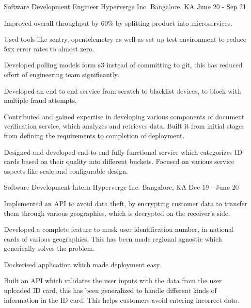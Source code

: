 \begin{cventries}
  \cventry
    {Software Development Engineer}
    {Hyperverge Inc.}
    {Bangalore, KA}
    {June 20 - Sep 21}
    {
      \begin{cvitems}
        \item {Improved overall throughput by 60\% by splitting product into microservices.}
        \item {Used tools like sentry, opentelemetry as well as set up test environment to reduce 5xx error rates to almost zero.}
        \item {Developed polling models form s3 instead of committing to git, this has reduced effort of engineering team significantly.}
        \item {Developed an end to end service from scratch to blacklist devices, to block with multiple fraud attempts.}
        \item {Contributed and gained expertise in developing various components of document verification service, which analyzes and retrieves data. Built it from initial stages from defining the requirements to completion of deployment.}
        \item {Designed and developed end-to-end fully functional service which categorizes ID cards based on their quality into different buckets. Focused on various service aspects like scale and configurable design.}
      \end{cvitems}
    }

  \cventry
    {Software Development Intern}
    {Hyperverge Inc.}
    {Bangalore, KA}
    {Dec 19 - June 20}
    {
      \begin{cvitems}
        \item {Implemented an API to avoid data theft, by encrypting customer data to transfer them through various geographies, which is decrypted on the receiver's side.}
        \item {Developed a complete feature to mask user identification number, in national cards of various geographies. This has been made regional agnostic which generically solves the problem.}
        \item {Dockerised application which made deployment easy.}
        \item {Built an API which validates the user inputs with the data from the user uploaded ID card, this has been generalized to handle different kinds of information in the ID card. This helps customers avoid entering incorrect data.}
      \end{cvitems}
    }

\end{cventries}
